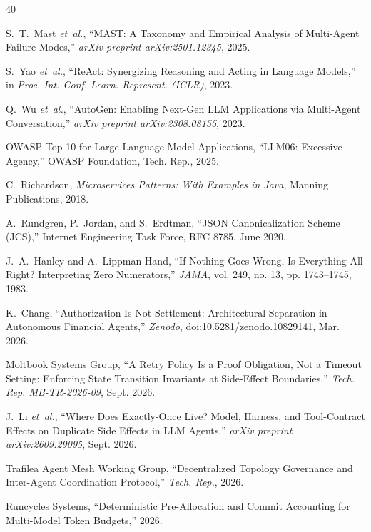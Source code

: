 \documentclass[10pt,journal,compsoc]{IEEEtran}
\begin{document}
\begin{thebibliography}{40}

S.~T.~Mast \emph{et~al.}, ``MAST: A Taxonomy and Empirical Analysis of Multi-Agent Failure Modes,'' \emph{arXiv preprint arXiv:2501.12345}, 2025.

S.~Yao \emph{et~al.}, ``ReAct: Synergizing Reasoning and Acting in Language Models,'' in \emph{Proc. Int. Conf. Learn. Represent. (ICLR)}, 2023.

Q.~Wu \emph{et~al.}, ``AutoGen: Enabling Next-Gen LLM Applications via Multi-Agent Conversation,'' \emph{arXiv preprint arXiv:2308.08155}, 2023.

OWASP Top 10 for Large Language Model Applications, ``LLM06: Excessive Agency,'' OWASP Foundation, Tech. Rep., 2025.

C.~Richardson, \emph{Microservices Patterns: With Examples in Java}, Manning Publications, 2018.

A.~Rundgren, P.~Jordan, and S.~Erdtman, ``JSON Canonicalization Scheme (JCS),'' Internet Engineering Task Force, RFC 8785, June 2020.

J.~A.~Hanley and A.~Lippman-Hand, ``If Nothing Goes Wrong, Is Everything All Right? Interpreting Zero Numerators,'' \emph{JAMA}, vol. 249, no. 13, pp. 1743--1745, 1983.

K.~Chang, ``Authorization Is Not Settlement: Architectural Separation in Autonomous Financial Agents,'' \emph{Zenodo}, doi:10.5281/zenodo.10829141, Mar. 2026.

Moltbook Systems Group, ``A Retry Policy Is a Proof Obligation, Not a Timeout Setting: Enforcing State Transition Invariants at Side-Effect Boundaries,'' \emph{Tech. Rep. MB-TR-2026-09}, Sept. 2026.

J.~Li \emph{et~al.}, ``Where Does Exactly-Once Live? Model, Harness, and Tool-Contract Effects on Duplicate Side Effects in LLM Agents,'' \emph{arXiv preprint arXiv:2609.29095}, Sept. 2026.

Trafilea Agent Mesh Working Group, ``Decentralized Topology Governance and Inter-Agent Coordination Protocol,'' \emph{Tech. Rep.}, 2026.

Runcycles Systems, ``Deterministic Pre-Allocation and Commit Accounting for Multi-Model Token Budgets,'' 2026.


\end{thebibliography}
\end{document}
